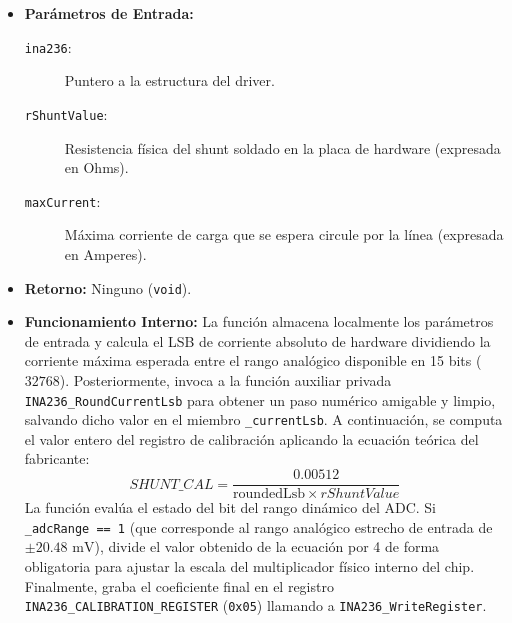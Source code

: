\documentclass[
10pt, %
a4paper, %
oneside, %
headinclude,footinclude, %
BCOR5mm, %
]{scrartcl}
\begin{document}
\begin{itemize}
	\item \textbf{Parámetros de Entrada:}
		\begin{description}
			\item[\texttt{ina236}:] Puntero a la estructura del driver.
			\item[\texttt{rShuntValue}:] Resistencia física del shunt soldado en la placa de hardware (expresada en Ohms).
			\item[\texttt{maxCurrent}:] Máxima corriente de carga que se espera circule por la línea (expresada en Amperes).
		\end{description}
	\item \textbf{Retorno:} Ninguno (\texttt{void}).
	\item \textbf{Funcionamiento Interno:}
		La función almacena localmente los parámetros de entrada y calcula el LSB de corriente absoluto de hardware dividiendo la corriente máxima esperada entre el rango analógico disponible en 15 bits ($32768$). 
		Posteriormente, invoca a la función auxiliar privada \texttt{INA236\_RoundCurrentLsb} para obtener un paso numérico amigable y limpio, salvando dicho valor en el miembro \texttt{\_currentLsb}.
		A continuación, se computa el valor entero del registro de calibración aplicando la ecuación teórica del fabricante:
		\begin{equation}
			SHUNT\_CAL = \frac{0.00512}{\text{roundedLsb} \times rShuntValue}
		\end{equation}
		La función evalúa el estado del bit del rango dinámico del ADC. Si \texttt{\_adcRange == 1} (que corresponde al rango analógico estrecho de entrada de $\pm 20.48\text{ mV}$), divide el valor obtenido de la ecuación por 4 de forma obligatoria para ajustar la escala del multiplicador físico interno del chip. Finalmente, graba el coeficiente final en el registro \texttt{INA236\_CALIBRATION\_REGISTER} (\texttt{0x05}) llamando a \texttt{INA236\_WriteRegister}.
\end{itemize}
\end{document}
